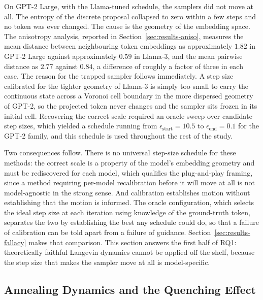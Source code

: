 On GPT-2 Large, with the Llama-tuned schedule, the samplers did not move at all. The entropy of the discrete proposal collapsed to zero within a few steps and no token was ever changed. The cause is the geometry of the embedding space. The anisotropy analysis, reported in Section~\ref{sec:results-aniso}, measures the mean distance between neighbouring token embeddings as approximately $1.82$ in GPT-2 Large against approximately $0.59$ in Llama-3, and the mean pairwise distance as $2.77$ against $0.84$, a difference of roughly a factor of three in each case.
The reason for the trapped sampler follows immediately. A step size calibrated for the tighter geometry of Llama-3 is simply too small to carry the continuous state across a Voronoi cell boundary in the more dispersed geometry of GPT-2, so the projected token never changes and the sampler sits frozen in its initial cell. Recovering the correct scale required an oracle sweep over candidate step sizes, which yielded a schedule running from $\epsilon_{\text{start}} = 10.5$ to $\epsilon_{\text{end}} = 0.1$ for the GPT-2 family, and this schedule is used throughout the rest of the study.

Two consequences follow. There is no universal step-size schedule for these methods: the correct scale is a property of the model's embedding geometry and must be rediscovered for each model, which qualifies the plug-and-play framing, since a method requiring per-model recalibration before it will move at all is not model-agnostic in the strong sense. And calibration establishes motion without establishing that the motion is informed. The oracle configuration, which selects the ideal step size at each iteration using knowledge of the ground-truth token, separates the two by establishing the best any schedule could do, so that a failure of calibration can be told apart from a failure of guidance. Section~\ref{sec:results-fallacy} makes that comparison. This section answers the first half of RQ1: theoretically faithful Langevin dynamics cannot be applied off the shelf, because the step size that makes the sampler move at all is model-specific.

\subsection{Annealing Dynamics and the Quenching Effect}
\label{sec:results-quench}

